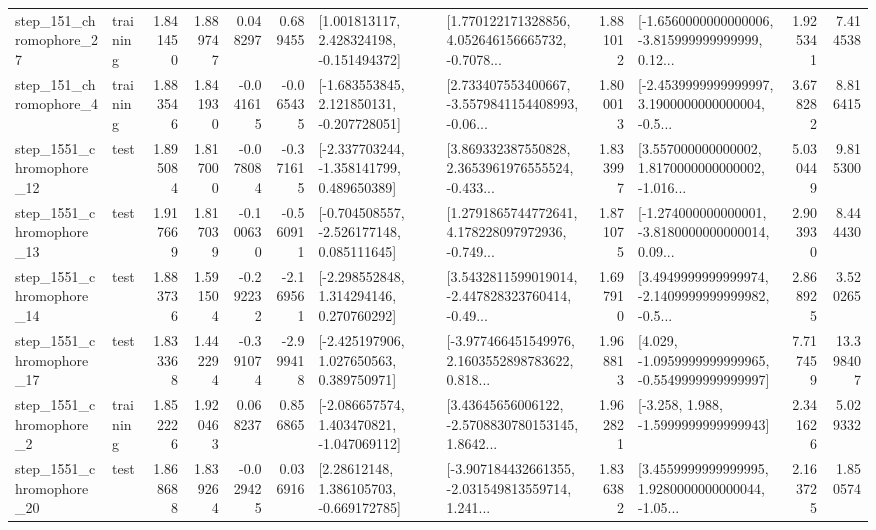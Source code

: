 \begin{tabular}{llrrrrllrlrr}
  step\_151\_chromophore\_27 &  training &      1.841450 &    1.889747 &      0.048297 &  0.689455 &    [1.001813117, 2.428324198, -0.151494372] &  [1.770122171328856, 4.052646156665732, -0.7078... &       1.881012 &  [-1.6560000000000006, -3.815999999999999, 0.12... &            1.925341 &          7.414538 \\
   step\_151\_chromophore\_4 &  training &      1.883546 &    1.841930 &     -0.041615 & -0.065435 &   [-1.683553845, 2.121850131, -0.207728051] &  [2.733407553400667, -3.5579841154408993, -0.06... &       1.800013 &  [-2.4539999999999997, 3.1900000000000004, -0.5... &            3.678282 &          8.816415 \\
 step\_1551\_chromophore\_12 &      test &      1.895084 &    1.817000 &     -0.078084 & -0.371615 &   [-2.337703244, -1.358141799, 0.489650389] &  [3.869332387550828, 2.3653961976555524, -0.433... &       1.833997 &  [3.557000000000002, 1.8170000000000002, -1.016... &            5.030449 &          9.815300 \\
 step\_1551\_chromophore\_13 &      test &      1.917669 &    1.817039 &     -0.100630 & -0.560911 &   [-0.704508557, -2.526177148, 0.085111645] &  [1.2791865744772641, 4.178228097972936, -0.749... &       1.871075 &  [-1.274000000000001, -3.8180000000000014, 0.09... &            2.903930 &          8.444430 \\
 step\_1551\_chromophore\_14 &      test &      1.883736 &    1.591504 &     -0.292232 & -2.169561 &    [-2.298552848, 1.314294146, 0.270760292] &  [3.5432811599019014, -2.447828323760414, -0.49... &       1.697910 &  [3.4949999999999974, -2.1409999999999982, -0.5... &            2.868925 &          3.520265 \\
 step\_1551\_chromophore\_17 &      test &      1.833368 &    1.442294 &     -0.391074 & -2.999418 &    [-2.425197906, 1.027650563, 0.389750971] &  [-3.977466451549976, 2.1603552898783622, 0.818... &       1.968813 &  [4.029, -1.0959999999999965, -0.5549999999999997] &            7.717459 &         13.398407 \\
  step\_1551\_chromophore\_2 &  training &      1.852226 &    1.920463 &      0.068237 &  0.856865 &   [-2.086657574, 1.403470821, -1.047069112] &  [3.43645656006122, -2.5708830780153145, 1.8642... &       1.962821 &               [-3.258, 1.988, -1.5999999999999943] &            2.341626 &          5.029332 \\
 step\_1551\_chromophore\_20 &      test &      1.868688 &    1.839264 &     -0.029425 &  0.036916 &     [2.28612148, 1.386105703, -0.669172785] &  [-3.907184432661355, -2.031549813559714, 1.241... &       1.836382 &  [3.4559999999999995, 1.9280000000000044, -1.05... &            2.163725 &          1.850574 \\

\end{tabular}
